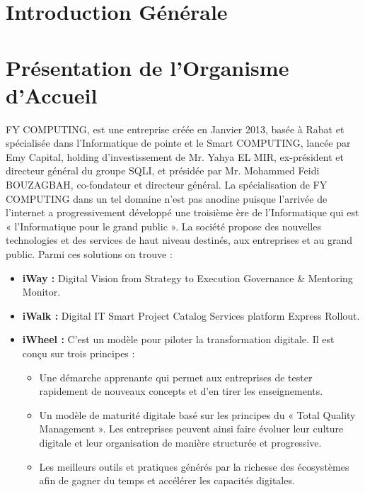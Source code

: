 \documentclass[a4paper,11pt,oneside]{report}
\begin{document}
\newpage

\chapter*{Introduction Générale}

\newpage

\chapter{Présentation de l'Organisme d'Accueil}

\newpage

FY COMPUTING, est  une entreprise créée en Janvier 2013, basée à Rabat et spécialisée dans l’Informatique de pointe et le Smart COMPUTING, lancée par Emy Capital, holding d’investissement de  Mr. Yahya EL MIR, ex-président et directeur général du groupe SQLI, et présidée par  Mr. Mohammed Feidi BOUZAGBAH, co-fondateur et directeur général. 
\newline
\newline
La spécialisation de FY COMPUTING dans un tel domaine n’est pas anodine puisque l’arrivée de l’internet a progressivement développé une troisième ère de l’Informatique qui est « l’Informatique pour le grand public ».          
\newline
\newline
La  société propose des nouvelles technologies et des services de haut niveau destinés, aux entreprises et au grand public. Parmi ces solutions on trouve :

\begin{itemize}
\item \textbf{iWay :} Digital Vision from Strategy to Execution Governance \& Mentoring  Monitor.
\item \textbf{iWalk :} Digital IT Smart Project Catalog Services platform Express Rollout.
\item \textbf{iWheel :} C'est un modèle pour piloter la transformation digitale. Il est conçu sur trois principes :

\begin{itemize}
\item Une démarche apprenante qui permet aux entreprises de tester rapidement de nouveaux concepts et d’en tirer les enseignements.

\item Un modèle de maturité digitale basé sur les principes du « Total Quality Management ». Les entreprises peuvent ainsi faire évoluer leur culture digitale et leur organisation de manière structurée et progressive.

\item Les meilleurs outils et pratiques générés par la richesse des écosystèmes afin de gagner du temps et accélérer les capacités digitales.
\end{itemize}
\end{itemize}
\end{document}

